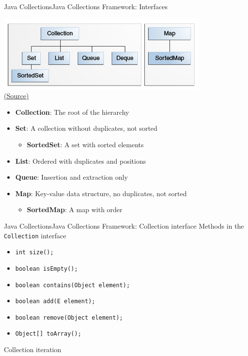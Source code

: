 \documentclass[10pt,compress]{beamer} %
\begin{document}
\begin{frame}{Java Collections}{Java Collections Framework: Interfaces}
	\begin{center}
	\includegraphics[width=0.6\linewidth]{figs/colls-coreInterfaces.png}\\
	\tiny \href{http://docs.oracle.com/javase/tutorial/collections/interfaces/index.html}{(Source)}
	\end{center}

	\begin{itemize}
		\item \textbf{Collection}: The root of the hierarchy
		\item \textbf{Set}: A collection without duplicates, not sorted
		\begin{itemize}
		\item \textbf{SortedSet}: A set with sorted elements
		\end{itemize}
		\item \textbf{List}: Ordered with duplicates and positions
		\item \textbf{Queue}: Insertion and extraction only
		\item \textbf{Map}: Key-value data structure, no duplicates, not sorted
		\begin{itemize}
		\item \textbf{SortedMap}: A map with order
		\end{itemize}
	\end{itemize}
\end{frame}

\begin{frame}{Java Collections}{Java Collections Framework: Collection interface}
	Methods in the \texttt{Collection} interface
	\begin{itemize}
		\item \texttt{int size();}
		\item \texttt{boolean isEmpty();}
		\item \texttt{boolean contains(Object element);}
		\item \texttt{boolean add(E element);}
		\item \texttt{boolean remove(Object element);}
		\item \texttt{Object[] toArray();}
	\end{itemize}
	
	\begin{block}{Collection iteration}
	\vspace{-0.2cm}
		
	\vspace{-0.2cm}
	\end{block}

\end{frame}
\end{document}
